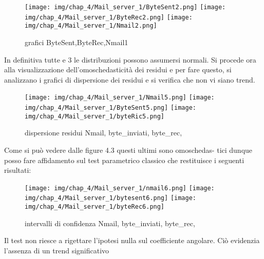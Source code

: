 \begin{figure}[H]
    \centering
    \texttt{[image: img/chap\_4/Mail\_server\_1/ByteSent2.png]}
    \texttt{[image: img/chap\_4/Mail\_server\_1/ByteRec2.png]}
    \texttt{[image: img/chap\_4/Mail\_server\_1/Nmail2.png]}
    \caption{grafici ByteSent,ByteRec,Nmail1}
    \label{fig:sis_2_25_k}
\end{figure}
\noindent
In definitiva tutte e 3 le distribuzioni possono assumersi normali.
Si procede ora alla visualizzazione dell’omoschedasticità dei residui e per fare questo, si analizzano i grafici di dispersione dei residui e si verifica  che non vi siano trend.

\begin{figure}[H]
    \centering
    \texttt{[image: img/chap\_4/Mail\_server\_1/Nmail5.png]}
    \texttt{[image: img/chap\_4/Mail\_server\_1/ByteSent5.png]}
    \texttt{[image: img/chap\_4/Mail\_server\_1/byteRic5.png]}
    \caption{dispersione residui Nmail, byte\_inviati, byte\_rec, }
    \label{fig:residui_omoschedastici}
\end{figure}
\noindent
Come si può vedere dalle figure 4.3 questi ultimi sono omoschedas-
tici dunque posso fare affidamento sul test parametrico classico che
restituisce i seguenti risultati:

\begin{figure}[H]
    \centering
    \texttt{[image: img/chap\_4/Mail\_server\_1/nmail6.png]}
    \texttt{[image: img/chap\_4/Mail\_server\_1/bytesent6.png]}
    \texttt{[image: img/chap\_4/Mail\_server\_1/byteRec6.png]}
    \caption{intervalli di confidenza Nmail, byte\_inviati, byte\_rec, }
    \label{fig:residui_omoschedastici}
\end{figure}
\noindent

Il test non riesce a rigettare l’ipotesi nulla sul coefficiente angolare. Ciò evidenzia l’assenza di un trend significativo

